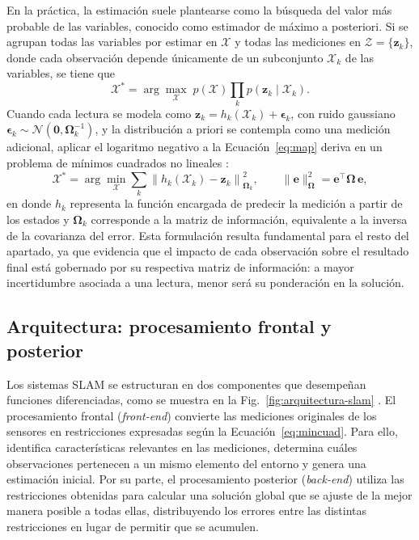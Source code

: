 En la práctica, la estimación suele plantearse como la búsqueda del valor más probable de las variables, conocido como estimador de máximo a posteriori.
Si se agrupan todas las variables por estimar en $\mathcal{X}$ y todas las mediciones en $\mathcal{Z}=\{\mathbf{z}_k\}$, donde cada observación depende únicamente de un subconjunto $\mathcal{X}_k$ de las variables, se tiene que \cite{cadena2016slam}
\begin{equation}
\mathcal{X}^{*} = \arg\max_{\mathcal{X}} \; p(\mathcal{X}) \prod_{k} p(\mathbf{z}_k \mid \mathcal{X}_k).
\label{eq:map}
\end{equation}
Cuando cada lectura se modela como $\mathbf{z}_k = h_k(\mathcal{X}_k) + \boldsymbol{\epsilon}_k$, con ruido gaussiano $\boldsymbol{\epsilon}_k \sim \mathcal{N}(\mathbf{0}, \boldsymbol{\Omega}_k^{-1})$, y la distribución a priori se contempla como una medición adicional, aplicar el logaritmo negativo a la Ecuación~\eqref{eq:map} deriva en un problema de mínimos cuadrados no lineales \cite{cadena2016slam}:
\begin{equation}
\mathcal{X}^{*} = \arg\min_{\mathcal{X}} \sum_{k} \left\| h_k(\mathcal{X}_k) - \mathbf{z}_k \right\|^{2}_{\boldsymbol{\Omega}_k},
\qquad
\|\mathbf{e}\|^{2}_{\boldsymbol{\Omega}} = \mathbf{e}^{\top}\boldsymbol{\Omega}\,\mathbf{e},
\label{eq:mincuad}
\end{equation}
en donde $h_k$ representa la función encargada de predecir la medición a partir de los estados y $\boldsymbol{\Omega}_k$ corresponde a la matriz de información, equivalente a la inversa de la covarianza del error.
Esta formulación resulta fundamental para el resto del apartado, ya que evidencia que el impacto de cada observación sobre el resultado final está gobernado por su respectiva matriz de información: a mayor incertidumbre asociada a una lectura, menor será su ponderación en la solución.

\subsection{Arquitectura: procesamiento frontal y posterior}

Los sistemas SLAM se estructuran en dos componentes que desempeñan funciones diferenciadas, como se muestra en la Fig.~\ref{fig:arquitectura-slam} \cite{cadena2016slam}.
El procesamiento frontal (\textit{front-end}) convierte las mediciones originales de los sensores en restricciones expresadas según la Ecuación~\eqref{eq:mincuad}.
Para ello, identifica características relevantes en las mediciones, determina cuáles observaciones pertenecen a un mismo elemento del entorno y genera una estimación inicial.
Por su parte, el procesamiento posterior (\textit{back-end}) utiliza las restricciones obtenidas para calcular una solución global que se ajuste de la mejor manera posible a todas ellas, distribuyendo los errores entre las distintas restricciones en lugar de permitir que se acumulen.

